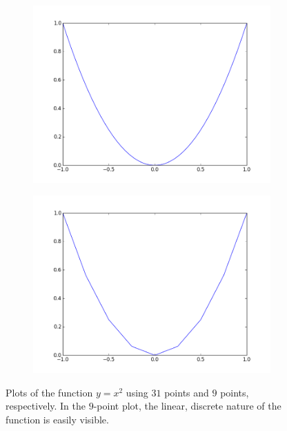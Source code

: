 \begin{center}
\begin{figure}
\begin{subfigure}{.49\textwidth}
\includegraphics[width=\textwidth]{x2.png}
\end{subfigure}
\begin{subfigure}{.49\textwidth}
\includegraphics[width=\textwidth]{x2a.png}
\end{subfigure}
\caption{Plots of the function $y=x^2$ using $31$ points and $9$ points, respectively.  In the $9$-point plot, the linear, discrete nature of the function is easily visible.}
\label{fig:x_squared}
\end{figure}
\end{center}

